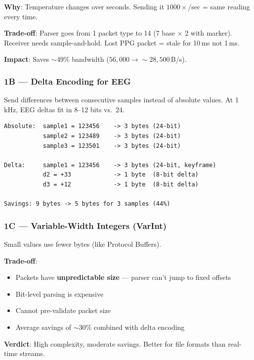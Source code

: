 \documentclass[11pt,a4paper]{article}
\begin{document}
\textbf{Why}: Temperature changes over seconds. Sending it $1000\times$/sec = same reading every time.

\textbf{Trade-off}: Parser goes from 1 packet type to 14 (7 base $\times$ 2 with marker). Receiver needs sample-and-hold. Lost PPG packet = stale for 10\,ms not 1\,ms.

\textbf{Impact}: Saves ${\sim}$49\% bandwidth ($56{,}000 \to {\sim}28{,}500$\,B/s).

\subsubsection{1B --- Delta Encoding for EEG}

Send differences between consecutive samples instead of absolute values. At 1\,kHz, EEG deltas fit in 8--12 bits vs.\ 24.

\begin{lstlisting}[style=diagram, caption={Delta encoding example}]
Absolute:  sample1 = 123456    -> 3 bytes (24-bit)
           sample2 = 123489    -> 3 bytes (24-bit)
           sample3 = 123501    -> 3 bytes (24-bit)

Delta:     sample1 = 123456    -> 3 bytes (24-bit, keyframe)
           d2 = +33            -> 1 byte  (8-bit delta)
           d3 = +12            -> 1 byte  (8-bit delta)

Savings: 9 bytes -> 5 bytes for 3 samples (44%)
\end{lstlisting}

\subsubsection{1C --- Variable-Width Integers (VarInt)}

Small values use fewer bytes (like Protocol Buffers).

\textbf{Trade-off}:
\begin{itemize}
    \item[\ding{55}] Packets have \textbf{unpredictable size} --- parser can't jump to fixed offsets
    \item[\ding{55}] Bit-level parsing is expensive
    \item[\ding{55}] Cannot pre-validate packet size
    \item[\ding{51}] Average savings of ${\sim}$30\% combined with delta encoding
\end{itemize}

\textbf{Verdict}: High complexity, moderate savings. Better for file formats than real-time streams.
\end{document}

